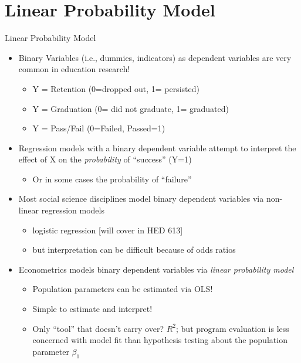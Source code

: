 \documentclass[8pt,ignorenonframetext,dvipsnames]{beamer}
\providecommand{\tightlist}{%
  \setlength{\itemsep}{0pt}\setlength{\parskip}{0pt}}
\let\olditem\item
\renewcommand{\item}{%
  \olditem\vspace{4pt}
}
\begin{document}
\hypertarget{linear-probability-model}{%
\section{Linear Probability Model}\label{linear-probability-model}}

\begin{frame}{Linear Probability Model}
\protect\hypertarget{linear-probability-model-1}{}

\begin{itemize}
\tightlist
\item
  Binary Variables (i.e., dummies, indicators) as dependent variables
  are very common in education research!

  \begin{itemize}
  \tightlist
  \item
    Y = Retention (0=dropped out, 1= persisted)
  \item
    Y = Graduation (0= did not graduate, 1= graduated)
  \item
    Y = Pass/Fail (0=Failed, Passed=1)
  \end{itemize}
\item
  Regression models with a binary dependent variable attempt to
  interpret the effect of X on the \emph{probability} of ``success''
  (Y=1)

  \begin{itemize}
  \tightlist
  \item
    Or in some cases the probability of ``failure''
  \end{itemize}
\item
  Most social science disciplines model binary dependent variables via
  non-linear regression models

  \begin{itemize}
  \tightlist
  \item
    logistic regression {[}will cover in HED 613{]}
  \item
    but interpretation can be difficult because of odds ratios
  \end{itemize}
\item
  Econometrics models binary dependent variables via \emph{linear
  probability model}

  \begin{itemize}
  \tightlist
  \item
    Population parameters can be estimated via OLS!
  \item
    Simple to estimate and interpret!
  \item
    Only ``tool'' that doesn't carry over? \(R^2\); but program
    evaluation is less concerned with model fit than hypothesis testing
    about the population parameter \(\beta_1\)
  \end{itemize}
\end{itemize}

\end{frame}
\end{document}

